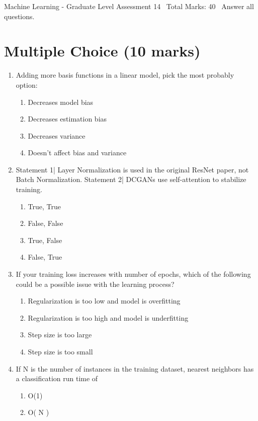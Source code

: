 \documentclass[12pt]{article}
\begin{document}
\begin{center}
Machine Learning - Graduate Level Assessment 14 \
Total Marks: 40 \
Answer all questions.
\end{center}

\section*{Multiple Choice (10 marks)}
\begin{enumerate}[label=\arabic*.]
\item Adding more basis functions in a linear model, pick the most probably option:
\begin{enumerate}[label=(\alph*)]
    \item Decreases model bias
    \item Decreases estimation bias
    \item Decreases variance
    \item Doesn't affect bias and variance
\end{enumerate}
\item Statement 1| Layer Normalization is used in the original ResNet paper, not Batch Normalization. Statement 2| DCGANs use self-attention to stabilize training.
\begin{enumerate}[label=(\alph*)]
    \item True, True
    \item False, False
    \item True, False
    \item False, True
\end{enumerate}
\item If your training loss increases with number of epochs, which of the following could be a possible issue with the learning process?
\begin{enumerate}[label=(\alph*)]
    \item Regularization is too low and model is overfitting
    \item Regularization is too high and model is underfitting
    \item Step size is too large
    \item Step size is too small
\end{enumerate}
\item If N is the number of instances in the training dataset, nearest neighbors has a classification run time of
\begin{enumerate}[label=(\alph*)]
    \item O(1)
    \item O( N )

\end{enumerate}
\end{enumerate}
\end{document}
